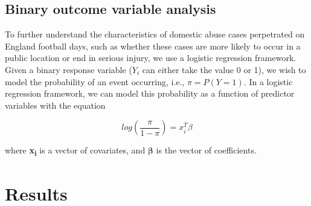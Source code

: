 \documentclass[12pt, a4paper]{article}
\begin{document}
\subsection{Binary outcome variable analysis}

To further understand the characteristics of domestic abuse cases perpetrated on England football days, such as whether these cases are more likely to occur in a public location or end in serious injury, we use a logistic regression framework. Given a binary response variable ($Y_{i}$ can either take the value 0 or 1), we wish to model the probability of an event occurring, i.e., $\pi = P(Y = 1)$. In a logistic regression framework, we can model this probability as a function of predictor variables with the equation

\begin{equation}
log(\frac{\pi}{1-\pi})= x_i^{T}\beta
\end{equation}

where \textbf{x\textsubscript{i}} is a vector of covariates, and $\boldsymbol{\beta}$ is the vector of coefficients. 


\section{Results}
\end{document}
